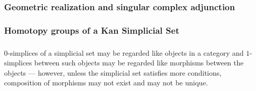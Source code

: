 







\subsubsection{Geometric realization and singular complex adjunction}










\subsubsection{Homotopy groups of a Kan Simplicial Set}







\subsubsection{}










$0$-simplices of a simplicial set may be regarded like objects in a category and $1$-simplices between such objects may be regarded like morphisms between the objects --- however, unless the simplicial set satisfies more conditions, composition of morphisms may not exist and may not be unique. 

